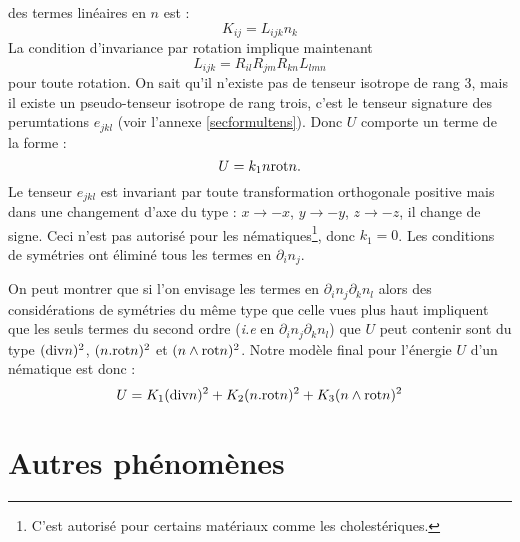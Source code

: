 \documentclass[12pt]{book}
\begin{document}
des termes lin\'eaires en $n$ est :
\begin{equation}
K_{ij}=L_{ijk}n_k
\end{equation}
La condition d'invariance par rotation implique maintenant 
\begin{equation}
L_{ijk}=R_{il}R_{jm}R_{kn}L_{lmn}
\end{equation}
pour toute rotation. On sait qu'il n'existe
pas de tenseur isotrope de rang 3, mais il existe un pseudo-tenseur
isotrope de rang trois, c'est le tenseur signature des perumtations $e_{jkl}$
(voir l'annexe \ref{secformultens}).
Donc $U$ comporte un terme de la forme :
\begin{equation}
U=k_1n{\rm rot} n.
\end{equation}
Le tenseur $e_{jkl}$ est invariant par toute transformation orthogonale
positive mais dans une changement d'axe du type :
$x\rightarrow -x$, $y\rightarrow -y$, $z\rightarrow -z$, il change 
de signe. Ceci n'est pas autoris\'e pour les n\'ematiques\footnote{%
 C'est autoris\'e
pour certains mat\'eriaux comme les cholest\'eriques. }, donc $k_1=0$.%
Les conditions de  sym\'etries ont \'elimin\'e tous les termes en
$\partial_i n_j$. 

On peut montrer que si l'on envisage les termes en $\partial_i n_j\partial_k
n_l$ alors des consid\'erations de sym\'etries du m\^ eme type que celle vues
plus haut impliquent que les seuls termes du second ordre ({\it i.e} en
$\partial_i n_j\partial_kn_l$) que $U$ peut contenir sont du type $({\rm div}
n)^2$, $(n.{\rm rot} n)^2$ et $(n \wedge {\rm rot} n)^2$. Notre mod\`ele final pour
l'\'energie $U$ d'un n\'ematique est donc :
\begin{equation}
U=K_1 ({\rm div} n)^2+K_2 (n.{\rm rot} n)^2+K_3(n \wedge {\rm rot} n)^2
\end{equation}



\section{Autres ph\'enom\`enes}
\end{document}

